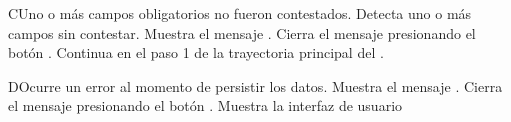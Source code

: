 
\begin{UCtrayectoriaA}{C}{Uno o más campos obligatorios no fueron contestados.}
  \UCpaso Detecta uno o más campos sin contestar.
    \UCpaso Muestra el mensaje .
    \UCpaso[\UCactor] Cierra el mensaje presionando el botón .
    \UCpaso Continua en el paso 1 de la trayectoria principal del .
\end{UCtrayectoriaA}


\begin{UCtrayectoriaA}{D}{Ocurre un error al momento de persistir los datos.}
	\UCpaso Muestra el mensaje .
	\UCpaso[\UCactor] Cierra el mensaje presionando el botón .
	\UCpaso Muestra la interfaz de usuario 
\end{UCtrayectoriaA}